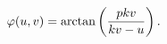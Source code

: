 \begin{equation}
  \label{eq:phantom3}
  \varphi(u,v)= \hbox{arctan}\left(\frac{pkv}{kv-u}\right) .
\end{equation}

